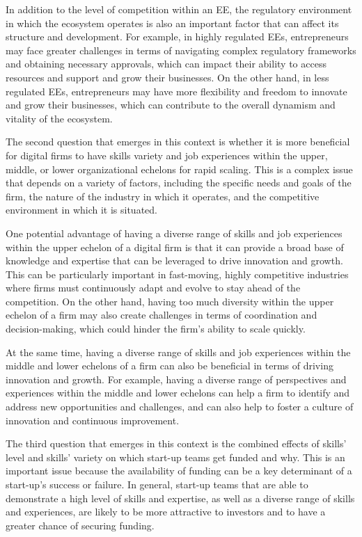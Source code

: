\documentclass[12pt]{article}
\begin{document}
In addition to the level of competition within an EE, the regulatory environment in which the ecosystem operates is also an important factor that can affect its structure and development. For example, in highly regulated EEs, entrepreneurs may face greater challenges in terms of navigating complex regulatory frameworks and obtaining necessary approvals, which can impact their ability to access resources and support and grow their businesses. On the other hand, in less regulated EEs, entrepreneurs may have more flexibility and freedom to innovate and grow their businesses, which can contribute to the overall dynamism and vitality of the ecosystem.

The second question that emerges in this context is whether it is more beneficial for digital firms to have skills variety and job experiences within the upper, middle, or lower organizational echelons for rapid scaling. This is a complex issue that depends on a variety of factors, including the specific needs and goals of the firm, the nature of the industry in which it operates, and the competitive environment in which it is situated.

One potential advantage of having a diverse range of skills and job experiences within the upper echelon of a digital firm is that it can provide a broad base of knowledge and expertise that can be leveraged to drive innovation and growth. This can be particularly important in fast-moving, highly competitive industries where firms must continuously adapt and evolve to stay ahead of the competition. On the other hand, having too much diversity within the upper echelon of a firm may also create challenges in terms of coordination and decision-making, which could hinder the firm's ability to scale quickly.

At the same time, having a diverse range of skills and job experiences within the middle and lower echelons of a firm can also be beneficial in terms of driving innovation and growth. For example, having a diverse range of perspectives and experiences within the middle and lower echelons can help a firm to identify and address new opportunities and challenges, and can also help to foster a culture of innovation and continuous improvement.

The third question that emerges in this context is the combined effects of skills' level and skills' variety on which start-up teams get funded and why. This is an important issue because the availability of funding can be a key determinant of a start-up's success or failure. In general, start-up teams that are able to demonstrate a high level of skills and expertise, as well as a diverse range of skills and experiences, are likely to be more attractive to investors and to have a greater chance of securing funding.
\end{document}
